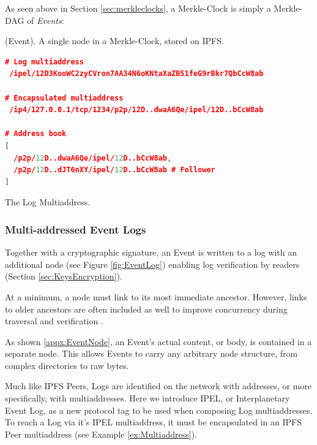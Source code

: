 \documentclass{textile}
\begin{document}
As seen above in Section \ref{sec:merkleclocks}, a Merkle-Clock is simply a Merkle-DAG of \emph{Events}:

\begin{definition}
 (Event). A single node in a Merkle-Clock, stored on IPFS.
\end{definition}

\FloatBarrier

\begin{example*}[!b]
\centering
\begin{minipage}{0.7\textwidth}
\begin{lstlisting}[language=json,firstnumber=1]
# Log multiaddress
 /ipel/12D3KooWC2zyCVron7AA34N6oKNtaXaZB51feG9rBkr7QbCcW8ab

# Encapsulated multiaddress
 /ip4/127.0.0.1/tcp/1234/p2p/12D..dwaA6Qe/ipel/12D..bCcW8ab

# Address book
[
  /p2p/12D..dwaA6Qe/ipel/12D..bCcW8ab,
  /p2p/12D..dJT6nXY/ipel/12D..bCcW8ab # Follower
]
\end{lstlisting}
\end{minipage}
  \caption{The Log Multiaddress.}
  \label{ex:Multiaddress}
\end{example*}

\subsubsection{Multi-addressed Event Logs}

Together with a cryptographic signature, an Event is written to a log with an additional node (see Figure \ref{fig:EventLog}) enabling log verification by readers (Section \ref{sec:KeysEncryption}).

At a minimum, a node must link to its most immediate ancestor. However, links to older ancestors are often included as well to improve concurrency during traversal and verification \cite{meyerBamboo2019}.

As shown \ref{appx:EventNode}, an Event's actual content, or body, is contained in a separate node. This allows Events to carry any arbitrary node structure, from complex directories to raw bytes.

Much like IPFS Peers, Logs are identified on the network with addresses, or more specifically, with multiaddresses\cite{multiformatsMultiaddr}. Here we introduce IPEL, or Interplanetary Event Log, as a new protocol tag to be used when composing Log multiaddresses. To reach a Log via it's IPEL multiaddress, it must be encapsulated in an IPFS Peer multiaddress (see Example \ref{ex:Multiaddress}).
\end{document}
